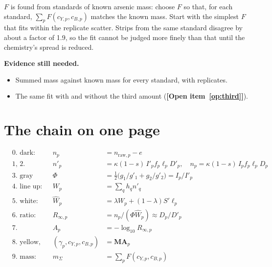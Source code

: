\documentclass[11pt,letter]{article}
\newcommand{\open}[1]{\textbf{[Open item~\ref{#1}]}}
\newcommand{\Lten}{\log_{10}}
\newcommand{\vA}{\mathbf{A}}
\newcommand{\mM}{\mathbf{M}}
\newenvironment{evidence}{\par\medskip\noindent\textbf{Evidence still
needed.}\begin{itemize}[nosep]}{\end{itemize}\medskip}
\begin{document}
$F$ is found from standards of known arsenic mass: choose $F$ so that, for
each standard, $\sum_p F(c_{Y,p}, c_{B,p})$ matches the known mass.  Start
with the simplest $F$ that fits within the replicate scatter.  Strips
from the same standard disagree by about a factor of 1.9, so the fit cannot
be judged more finely than that until the chemistry's spread is reduced.

\begin{evidence}
  \item Summed mass against known mass for every standard, with replicates.
  \item The same fit with and without the third amount (\open{op:third}).
\end{evidence}

\section{The chain on one page}
\label{sec:summary}

\begin{align*}
  &\text{0. dark:}         & n_p &= n_{\text{raw},p} - e \\
  &\text{1, 2. photos:}    & n'_p &= \kappa(1-s)\,I'_p f_p \ell_p D'_p, \quad
                             n_p = \kappa(1-s)\,I_p f_p \ell_p D_p \\
  &\text{3. gray ratio:}   & \Phi &= \tfrac12\bigl(g_1/g'_1 + g_2/g'_2\bigr)
                             = I_p/I'_p \\
  &\text{4. line up:}      & W_p &= \textstyle\sum_q h_q n'_q \\
  &\text{5. white:}        & \widehat W_p &= \lambda W_p + (1-\lambda) S'\ell_p \\
  &\text{6. ratio:}        & R_{\infty,p} &= n_p / (\Phi\widehat W_p)
                             \approx D_p / D'_p \\
  &\text{7. absorbance:}   & A_p &= -\Lten R_{\infty,p} \\
  &\text{8. yellow, brown:}& (\gamma_p, c_{Y,p}, c_{B,p}) &= \mM\vA_p \\
  &\text{9. mass:}         & m_\Sigma &= \textstyle\sum_p F(c_{Y,p}, c_{B,p})
\end{align*}
\end{document}
